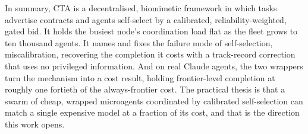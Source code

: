 \documentclass[11pt]{article}
\begin{document}
In summary, CTA is a decentralised, biomimetic framework in which tasks advertise contracts and agents self-select by a calibrated, reliability-weighted, gated bid. It holds the busiest node's coordination load flat as the fleet grows to ten thousand agents. It names and fixes the failure mode of self-selection, miscalibration, recovering the completion it costs with a track-record correction that uses no privileged information. And on real Claude agents, the two wrappers turn the mechanism into a cost result, holding frontier-level completion at roughly one fortieth of the always-frontier cost. The practical thesis is that a swarm of cheap, wrapped microagents coordinated by calibrated self-selection can match a single expensive model at a fraction of its cost, and that is the direction this work opens.



\end{document}
